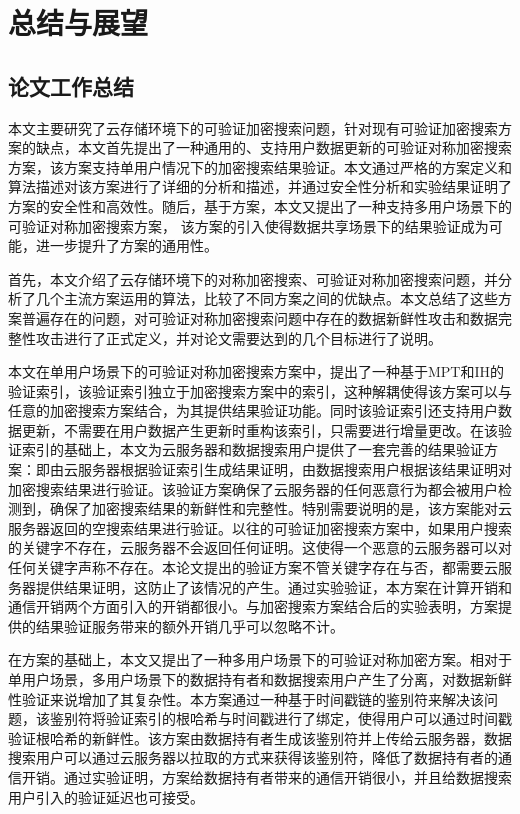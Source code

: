 \chapter{总结与展望}
\label{cha:conclusion}
\section{论文工作总结}
本文主要研究了云存储环境下的可验证加密搜索问题，针对现有可验证加密搜索方案的缺点，本文首先提出了一种通用的、支持用户数据更新的可验证对称加密搜索方案\single，该方案支持单用户情况下的加密搜索结果验证。本文通过严格的方案定义和算法描述对该方案进行了详细的分析和描述，并通过安全性分析和实验结果证明了\single 方案的安全性和高效性。随后，基于\single 方案，本文又提出了一种支持多用户场景下的可验证对称加密搜索方案\multi ， 该方案的引入使得数据共享场景下的结果验证成为可能，进一步提升了方案的通用性。

首先，本文介绍了云存储环境下的对称加密搜索、可验证对称加密搜索问题，并分析了几个主流方案运用的算法，比较了不同方案之间的优缺点。本文总结了这些方案普遍存在的问题，对可验证对称加密搜索问题中存在的数据新鲜性攻击和数据完整性攻击进行了正式定义，并对论文需要达到的几个目标进行了说明。

本文在单用户场景下的可验证对称加密搜索方案\single 中，提出了一种基于MPT和IH的验证索引，该验证索引独立于加密搜索方案中的索引，这种解耦使得该方案可以与任意的加密搜索方案结合，为其提供结果验证功能。同时该验证索引还支持用户数据更新，不需要在用户数据产生更新时重构该索引，只需要进行增量更改。在该验证索引的基础上，本文为云服务器和数据搜索用户提供了一套完善的结果验证方案：即由云服务器根据验证索引生成结果证明，由数据搜索用户根据该结果证明对加密搜索结果进行验证。该验证方案确保了云服务器的任何恶意行为都会被用户检测到，确保了加密搜索结果的新鲜性和完整性。特别需要说明的是，该方案能对云服务器返回的空搜索结果进行验证。以往的可验证加密搜索方案中，如果用户搜索的关键字不存在，云服务器不会返回任何证明。这使得一个恶意的云服务器可以对任何关键字声称不存在。本论文提出的验证方案不管关键字存在与否，都需要云服务器提供结果证明，这防止了该情况的产生。通过实验验证，本方案在计算开销和通信开销两个方面引入的开销都很小。与加密搜索方案结合后的实验表明，\single 方案提供的结果验证服务带来的额外开销几乎可以忽略不计。

在\single 方案的基础上，本文又提出了一种多用户场景下的可验证对称加密方案\multi 。相对于单用户场景，多用户场景下的数据持有者和数据搜索用户产生了分离，对数据新鲜性验证来说增加了其复杂性。本方案通过一种基于时间戳链的鉴别符来解决该问题，该鉴别符将验证索引的根哈希与时间戳进行了绑定，使得用户可以通过时间戳验证根哈希的新鲜性。该方案由数据持有者生成该鉴别符并上传给云服务器，数据搜索用户可以通过云服务器以拉取的方式来获得该鉴别符，降低了数据持有者的通信开销。通过实验证明，\multi 方案给数据持有者带来的通信开销很小，并且给数据搜索用户引入的验证延迟也可接受。

